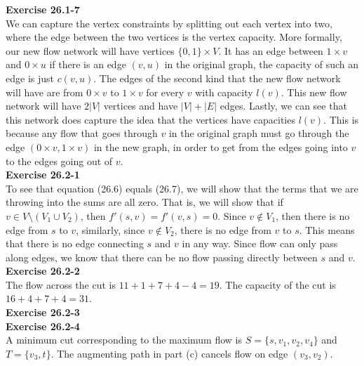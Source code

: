 \documentclass{article}
\begin{document}
\noindent\textbf{Exercise 26.1-7}\\

We can capture the vertex constraints by splitting out each vertex into two, where the edge between the two vertices is the vertex capacity. More formally, our new flow network will have vertices $\{0,1\} \times V$. It has an edge between $1 \times v$ and $0 \times u$ if there is an edge $(v,u)$ in the original graph, the capacity of such an edge is just $c(v,u)$. The edges of the second kind that the new flow network will have are from $0\times v$ to $1\times v$ for every $v$ with capacity $l(v)$. This new flow network will have $2|V|$ vertices and have $|V|+|E|$ edges. Lastly, we can see that this network does capture the idea that the vertices have capacities $l(v)$. This is because any flow that goes through $v$ in the original graph must go through the edge $(0\times v, 1\times v)$ in the new graph, in order to get from the edges going into $v$ to the edges going out of $v$.\\



\noindent\textbf{Exercise 26.2-1}\\

To see that equation (26.6) equals (26.7), we will show that the terms that we are throwing into the sums are all zero. That is, we will show that if $v\in V\setminus(V_1 \cup V_2)$, then $f'(s,v) = f'(v,s) = 0$. Since $v\not\in V_1$, then there is no edge from $s$ to $v$, similarly, since $v\not\in V_2$, there is no edge from $v$ to $s$. This means that there is no edge connecting $s$ and $v$ in any way. Since flow can only pass along edges, we know that there can be no flow passing directly between $s$ and $v$.\\

\noindent\textbf{Exercise 26.2-2}\\

The flow across the cut is $11 + 1 + 7 + 4 - 4 = 19$.  The capacity of the cut is $16 + 4 + 7 + 4 = 31$.\\


\noindent\textbf{Exercise 26.2-3}\\


\noindent\textbf{Exercise 26.2-4}\\

A minimum cut corresponding to the maximum flow is $S = \{s, v_1, v_2, v_4\}$ and $T= \{v_3, t\}$.  The augmenting path in part (c) cancels flow on edge $(v_3, v_2)$.\\
\end{document}
